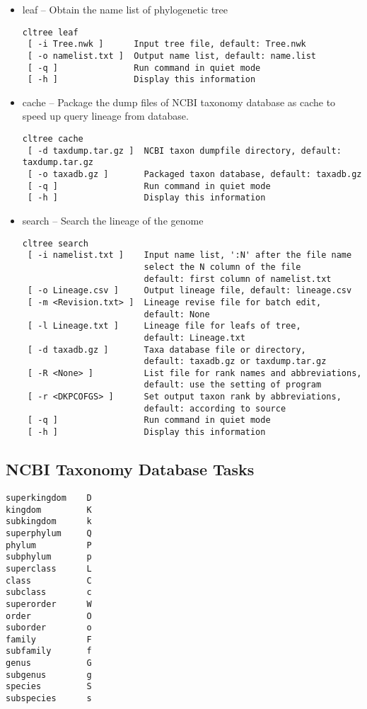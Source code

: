 \documentclass[12pt,a4paper]{article}
\begin{document}
\begin{itemize}\itemsep 0pt
\item leaf -- Obtain the name list of phylogenetic tree
\begin{verbatim}
cltree leaf
 [ -i Tree.nwk ]      Input tree file, default: Tree.nwk
 [ -o namelist.txt ]  Output name list, default: name.list
 [ -q ]               Run command in quiet mode
 [ -h ]               Display this information
\end{verbatim}

\item cache -- Package the dump files of NCBI taxonomy database as cache to speed up query lineage from database.
\begin{verbatim}
cltree cache
 [ -d taxdump.tar.gz ]  NCBI taxon dumpfile directory, default: taxdump.tar.gz
 [ -o taxadb.gz ]       Packaged taxon database, default: taxadb.gz
 [ -q ]                 Run command in quiet mode
 [ -h ]                 Display this information
\end{verbatim}

\item search -- Search the lineage of the genome
\begin{verbatim}
cltree search
 [ -i namelist.txt ]    Input name list, ':N' after the file name
                        select the N column of the file
                        default: first column of namelist.txt
 [ -o Lineage.csv ]     Output lineage file, default: lineage.csv
 [ -m <Revision.txt> ]  Lineage revise file for batch edit,
                        default: None
 [ -l Lineage.txt ]     Lineage file for leafs of tree,
                        default: Lineage.txt
 [ -d taxadb.gz ]       Taxa database file or directory,
                        default: taxadb.gz or taxdump.tar.gz
 [ -R <None> ]          List file for rank names and abbreviations,
                        default: use the setting of program
 [ -r <DKPCOFGS> ]      Set output taxon rank by abbreviations,
                        default: according to source
 [ -q ]                 Run command in quiet mode
 [ -h ]                 Display this information
\end{verbatim}
\end{itemize}

\subsection{NCBI Taxonomy Database Tasks}

\begin{verbatim}
superkingdom    D
kingdom         K
subkingdom      k
superphylum     Q
phylum          P
subphylum       p
superclass      L
class           C
subclass        c
superorder      W
order           O
suborder        o
family          F
subfamily       f
genus           G
subgenus        g
species         S
subspecies      s
\end{verbatim}
\end{document}
